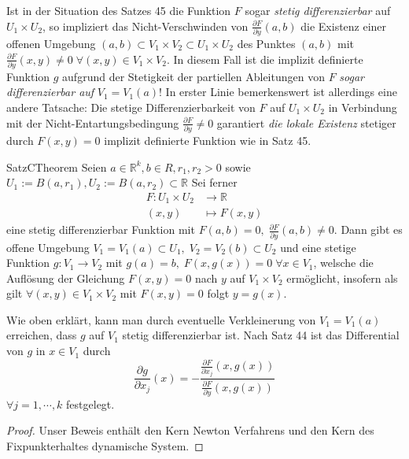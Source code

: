 Ist in der Situation des Satzes 45 die Funktion $ F $ sogar \textit{stetig differenzierbar} auf $ U_1 \times U_2 $, so impliziert das 
Nicht-Verschwinden von $ \frac{\partial F}{\partial y} (a,b) $ die Existenz einer offenen Umgebung $ (a,b) \subset   V_1 \times V_2
\subset  U_1 \times U_2$ des Punktes $ (a,b) $ mit $ \frac{\partial F}{\partial y} (x,y) \neq 0 \; \forall  (x,y) \in  V_1 \times V_2	$.
In diesem Fall ist die implizit definierte Funktion $ g $ aufgrund der Stetigkeit der partiellen Ableitungen von $ F $ \textit{sogar 
differenzierbar auf }$ V_1 = V_1 (a)  $! In erster Linie bemerkenswert ist allerdings eine andere Tatsache: Die stetige
Differenzierbarkeit von $ F $ auf $ U_1 \times U_2 $ in Verbindung mit der Nicht-Entartungsbedingung $ \frac{\partial F}{\partial y} 
\neq 0$ garantiert \textit{die lokale Existenz} stetiger durch $ F \left( x,y \right) = 0 $ implizit definierte Funktion wie in 
Satz 45.

\begin{ibox}[46]{Satz}{CTheorem}
    Seien $ a \in \mathbb{R}^{k}, b \in R, r_1, r_2 > 0	$ sowie $ U_1 := B (a,r_1), U_2 := B (a,r_2) \subset \mathbb{R}  $ Sei ferner
		\begin{align*}
			F: U_1 \times U_2 & \to \mathbb{R} \\
			(x,y) & \mapsto F(x,y)
		\end{align*}
	eine stetig differenzierbar Funktion mit $ F (a,b)  = 0, \; \frac{\partial F}{\partial y} (a,b) \neq 0 $. Dann gibt es offene 
	Umgebung $ V_1 = V_1 (a)  \subset U_1, \; V_2 = V_2 (b)  \subset U_2 $ und eine stetige Funktion $ g: V_1 \to V_2 $ mit 
	$ g (a) = b, \; F \left( x, g(x) \right) = 0 \; \forall  x \in V_1 $, welsche die Auflösung der Gleichung $ F (x,y) = 0 $ nach $ y $ 
	auf $ V_1 \times V_2 $ ermöglicht, insofern als gilt $ \forall (x,y) \in  V_1 \times V_2 $ mit $ F (x,y) = 0 $ folgt $ y = g (x)  $.
\end{ibox}
Wie oben erklärt, kann man durch eventuelle Verkleinerung von $ V_1 = V_1 (a)  $ erreichen, dass $ g $ auf $ V_1 $ stetig
differenzierbar ist. Nach Satz 44 ist das Differential von $ g $ in $ x \in V_1 $ durch 
$$ \frac{\partial g}{\partial x_j} (x) = - \frac{ \frac{\partial F}{\partial x_j}( x, g (x))  }{ \frac{\partial F}{\partial y} 
(x, g(x))} $$
$ \forall j = 1, \cdots,  k  $ festgelegt.
\begin{proof}
	Unser Beweis enthält den Kern Newton Verfahrens und den Kern des Fixpunkterhaltes dynamische System.
\end{proof}

%
